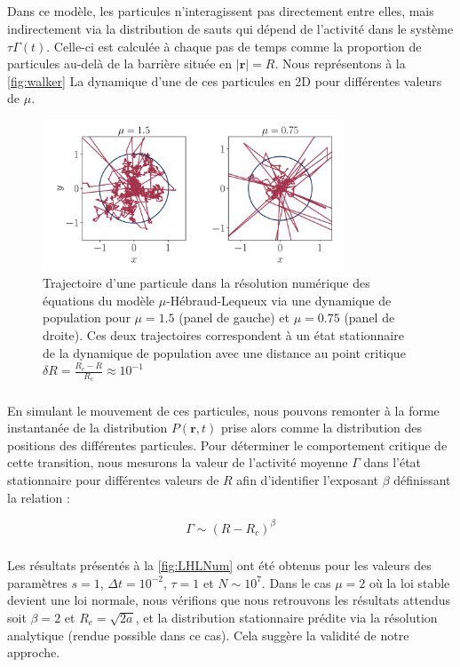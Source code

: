 \subparagraph{}Dans ce modèle, les particules n'interagissent pas directement entre elles, mais indirectement via la distribution de sauts qui dépend de l'activité dans le système $\tau\Gamma (t)$. Celle-ci est calculée à chaque pas de temps comme la proportion de particules au-delà de la barrière située en $|\mathbf{r}|=R$. Nous représentons à la \autoref{fig:walker} La dynamique d'une de ces particules en 2D pour différentes valeurs de $\mu$.

\begin{figure}[h]
	\centering
	\includegraphics[width= 0.8\textwidth]{walker.pdf}
	\caption{Trajectoire d'une particule dans la résolution numérique des équations du modèle $\mu$-Hébraud-Lequeux via une dynamique de population pour $\mu = 1.5$ (panel de gauche) et $\mu = 0.75$ (panel de droite). Ces deux trajectoires correspondent à un état stationnaire de la dynamique de population avec une distance au point critique $\delta R = \frac{R_c-R}{R_c}\approx 10^{-1}$}
	 \label{fig:walker}
\end{figure}

\subparagraph{}En simulant le mouvement de ces particules, nous pouvons remonter à la forme instantanée de la distribution $P(\mathbf{r},t)$ prise alors comme la distribution des positions des différentes particules. Pour déterminer le comportement critique de cette transition, nous mesurons la valeur de l'activité moyenne $\Gamma$ dans l'état stationnaire pour différentes valeurs de $R$ afin d'identifier l'exposant $\beta$ définissant la relation :

\begin{equation}
	\Gamma \sim (R-R_c)^\beta
\end{equation}

\subparagraph{} Les résultats présentés à la \autoref{fig:LHLNum} ont été obtenus pour les valeurs des paramètres $s=1$, $\Delta t  = 10^{-2}$, $\tau = 1$ et $N \sim 10^7$. Dans le cas $\mu = 2$ où la loi stable devient une loi normale, nous vérifions que nous retrouvons les résultats attendus soit $\beta = 2$ et $R_c = \sqrt{2a}$, et la distribution stationnaire  prédite via la résolution analytique (rendue possible dans ce cas). Cela suggère la validité de notre approche.

